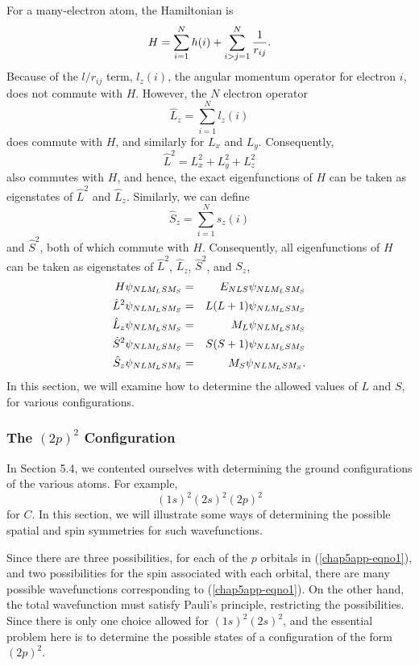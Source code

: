 For a many-electron atom, the Hamiltonian is
\begin{equation}
H = \sum_{i=1}^{N} h(i) + \sum^{N}_{i>j=1} {1 \over r_{ij}}.
\end{equation}
Because of the $l/r_{ij}$ term, $l_z(i)$, the angular momentum
operator for electron $i$, does not commute with $H$.  However, the
$N$ electron operator
\begin{equation}
{\hat L}_z = \sum^{N}_{i=1} l_z(i)
\end{equation}
does commute with $H$, and similarly for $L_x$ and $L_y$.  
Consequently,
\begin{equation}
{\hat L}^2 = L^2_x + L^2_y + L^2_z
\end{equation}
also commutes with $H$, and hence, the exact eigenfunctions 
of $H$ can be taken as eigenstates of ${\hat L}^2$ and ${\hat 
L}_z$.  Similarly, we can define
\begin{equation}
{\hat S}_z = \sum^{N}_{i=1} s_z (i)
\end{equation}
and ${\hat S}^2$, both of which commute with $H$.  
Consequently, all eigenfunctions of $H$ can be taken as 
eigenstates of ${\hat L}^2$, ${\hat L}_z$, ${\hat S}^2$, and $S_z$,
\begin{eqnarray}
H \psi_{NLM_LSM_S} &=& E_{NLS} \psi_{NLM_LSM_S}\cr
{\hat L}^2 \psi_{NLM_LSM_S} &=& L(L+1) \psi_{NLM_LSM_S}\cr
{\hat L}_z \psi_{NLM_LSM_S} &=& M_L \psi_{NLM_LSM_S}\cr
{\hat S}^2 \psi_{NLM_LSM_S} &=& S(S+1) \psi_{NLM_LSM_S}\cr
{\hat S}_z \psi_{NLM_LSM_S} &=& M_S \psi_{NLM_LSM_S}.
\end{eqnarray}
In this section, we will examine how to determine the allowed values 
of $L$ and $S$, for various configurations.

\subsubsection{The $(2p)^2$ Configuration}

In Section 5.4, we contented ourselves with determining the ground 
configurations of the various atoms.  For example,
\begin{equation}
(1s)^2 (2s)^2 (2p)^2
\label{chap5app-eqno1}
\end{equation}
for $C$.  In this section, we will illustrate some ways of 
determining the possible spatial and spin symmetries for such 
wavefunctions.

Since there are three possibilities, for each of the $p$ orbitals in
(\ref{chap5app-eqno1}), and two possibilities for the spin associated
with each orbital, there are many possible wavefunctions corresponding
to (\ref{chap5app-eqno1}).  On the other hand, the total wavefunction
must satisfy Pauli's principle, restricting the possibilities.  Since
there is only one choice allowed for $(1s)^2(2s)^2$, and the essential
problem here is to determine the possible states of a configuration of
the form $(2p)^2$.

